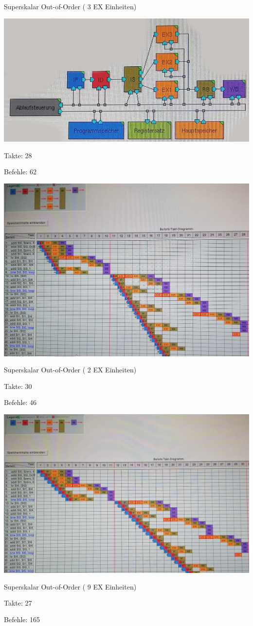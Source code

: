 \documentclass[a4paper,12pt,titlepage]{scrartcl}
\begin{document}
\begin{itemize*}
\begin{itemize*}
    \end{itemize*}
    \item Superskalar Out-of-Order ( 3 EX Einheiten)
    \begin{itemize*}
        \item \includegraphics[width=.4\linewidth]{Assets/RA2-65743.jpg}
        \item Takte: 28
        \item Befehle: 62
        \item \includegraphics[width=.4\linewidth]{Assets/RA2-70806.jpg}
    \end{itemize*}
    \item Superskalar Out-of-Order ( 2 EX Einheiten)
    \begin{itemize*}
        \item Takte: 30
        \item Befehle: 46
        \item \includegraphics[width=.4\linewidth]{Assets/RA2-70953.jpg}
    \end{itemize*}
    \item Superskalar Out-of-Order ( 9 EX Einheiten)
    \begin{itemize*}
        \item Takte: 27
        \item Befehle: 165
    \end{itemize*}
\end{itemize*}
\end{document}
